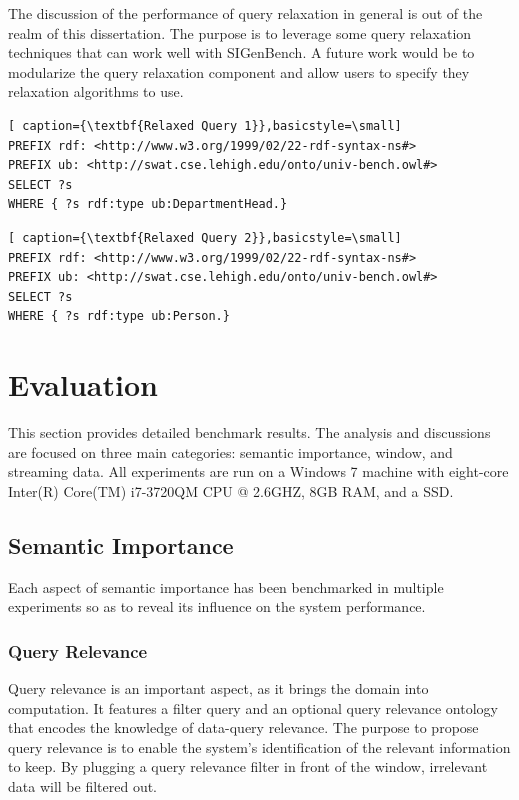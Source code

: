 The discussion of the performance of query relaxation in general is out of the realm of this dissertation. 
The purpose is to leverage some query relaxation techniques that can work well with SIGenBench. 
A future work would be to modularize the query relaxation component and allow users to specify they relaxation algorithms to use.

\begin{lstlisting}[ caption={\textbf{Relaxed Query 1}},basicstyle=\small]
PREFIX rdf: <http://www.w3.org/1999/02/22-rdf-syntax-ns#>
PREFIX ub: <http://swat.cse.lehigh.edu/onto/univ-bench.owl#>
SELECT ?s
WHERE {	?s rdf:type ub:DepartmentHead.}
\end{lstlisting}

\begin{lstlisting}[ caption={\textbf{Relaxed Query 2}},basicstyle=\small]
PREFIX rdf: <http://www.w3.org/1999/02/22-rdf-syntax-ns#>
PREFIX ub: <http://swat.cse.lehigh.edu/onto/univ-bench.owl#>
SELECT ?s
WHERE {	?s rdf:type ub:Person.}
\end{lstlisting}
%
\section{Evaluation}
This section provides detailed benchmark results.
The analysis and discussions are focused on three main categories: semantic importance, window, and streaming data.
All experiments are run on a Windows 7 machine with eight-core Inter(R) Core(TM) i7-3720QM CPU @ 2.6GHZ, 8GB RAM, and a SSD. 
%
\subsection{Semantic Importance}
Each aspect of semantic importance has been benchmarked in multiple experiments so as to reveal its influence on the system performance. 
%
\subsubsection{Query Relevance}
Query relevance is an important aspect, as it brings the domain into computation.
It features a filter query and an optional query relevance ontology that encodes the knowledge of data-query relevance.
The purpose to propose query relevance is to enable the system's identification of the relevant information to keep. 
By plugging a query relevance filter in front of the window, irrelevant data will be filtered out.

